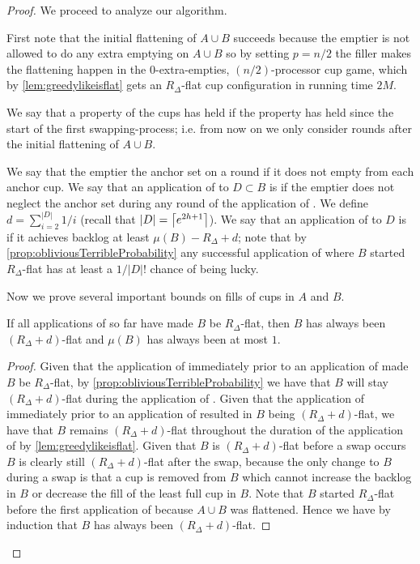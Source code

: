 \begin{proof}
We proceed to analyze our algorithm.

First note that the initial flattening of $A\cup B$ succeeds
because the emptier is not allowed to do any extra emptying on
$A\cup B$ so by setting $p=n/2$ the filler makes the flattening
happen in the $0$-extra-empties, $(n/2)$-processor cup game,
which by \cref{lem:greedylikeisflat} gets an $R_\Delta$-flat cup
configuration in running time $2M$.

We say that a property of the cups has  held if the
property has held since the start of the first swapping-process;
i.e. from now on we only consider rounds after the initial
flattening of $A\cup B$.

We say that the emptier  the anchor set on a round
if it does not empty from each anchor cup. We say that an
application of \randalg to $D\subset B$ is  if
the emptier does not neglect the anchor set during any round of
the application of \randalg. We define $d = \sum_{i=2}^{|D|} 1/i$ (recall
that $|D| = \left\lceil e^{2h+1} \right\rceil$). We say that an application of
\randalg to $D$ is  if it achieves backlog at
least $\mu(B) - R_\Delta + d$; note that by 
\cref{prop:obliviousTerribleProbability} any successful
application of \randalg where $B$ started $R_\Delta$-flat has
at least a $1/|D|!$ chance of being lucky. 

Now we prove several important bounds on fills of cups in $A$ and $B$.
\begin{clm}
  \label{clm:oblivBaseIntenseInduction1}
  If all applications of \flatalg so far have made
  $B$ be $R_\Delta$-flat, then $B$ has always been $(R_\Delta +
  d)$-flat and $\mu(B)$ has always been at most $1$.
\end{clm}
\begin{proof}
  Given that the application of \flatalg immediately prior to an application
  of \randalg made $B$ be $R_\Delta$-flat, by
  \cref{prop:obliviousTerribleProbability} we have that $B$ will
  stay $(R_\Delta + d)$-flat during the application of \randalg. 
  Given that the application of \randalg immediately prior to an
  application of \flatalg resulted in $B$ being $(R_\Delta
  + d)$-flat, we have that $B$ remains $(R_\Delta + d)$-flat
  throughout the duration of the application of \flatalg by
  \cref{lem:greedylikeisflat}. Given that $B$ is $(R_\Delta +
  d)$-flat before a swap occurs $B$ is clearly still $(R_\Delta +
  d)$-flat after the swap, because the only change to $B$ during
  a swap is that a cup is removed from $B$ which cannot increase
  the backlog in $B$ or decrease the fill of the least full cup
  in $B$. Note that $B$ started $R_\Delta$-flat before the first
  application of \flatalg because $A\cup B$ was flattened.
  Hence we have by induction that $B$ has always been $(R_\Delta
  + d)$-flat. 


\end{proof}
\end{proof}
